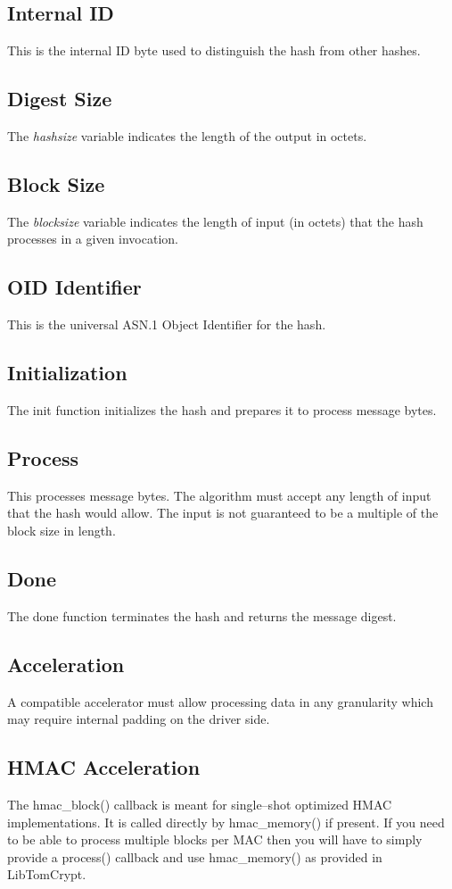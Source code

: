 \documentclass[synpaper]{book}
\begin{document}
\subsection{Internal ID}
This is the internal ID byte used to distinguish the hash from other hashes.

\subsection{Digest Size}
The \textit{hashsize} variable indicates the length of the output in octets.

\subsection{Block Size}
The \textit{blocksize} variable indicates the length of input (in octets) that the hash processes in a given
invocation.

\subsection{OID Identifier}
This is the universal ASN.1 Object Identifier for the hash.

\subsection{Initialization}
The init function initializes the hash and prepares it to process message bytes.

\subsection{Process}
This processes message bytes.  The algorithm must accept any length of input that the hash would allow.  The input is not
guaranteed to be a multiple of the block size in length.

\subsection{Done}
The done function terminates the hash and returns the message digest.

\subsection{Acceleration}
A compatible accelerator must allow processing data in any granularity which may require internal padding on the driver side.

\subsection{HMAC Acceleration}
The hmac\_block() callback is meant for single--shot optimized HMAC implementations.  It is called directly by hmac\_memory() if present.  If you need
to be able to process multiple blocks per MAC then you will have to simply provide a process() callback and use hmac\_memory() as provided in LibTomCrypt.
\end{document}
